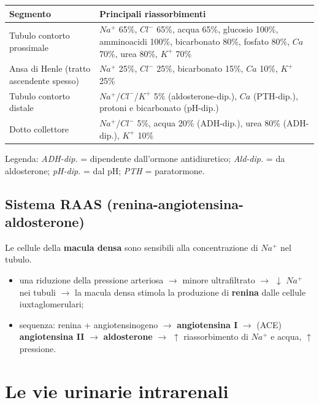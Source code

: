 \begin{table}[htbp]
  \centering \small \renewcommand{\arraystretch}{1.3}
  \begin{tabularx}{\textwidth}{|l|X|}
    \hline
    \textbf{Segmento} & \textbf{Principali riassorbimenti} \\
    \hline
    Tubulo contorto prossimale
      & $Na^+$ 65\%, $Cl^-$ 65\%, acqua 65\%, glucosio 100\%, amminoacidi 100\%, bicarbonato 80\%,
        fosfato 80\%, $Ca$ 70\%, urea 80\%, $K^+$ 70\% \\
    \hline
    Ansa di Henle (tratto ascendente spesso)
      & $Na^+$ 25\%, $Cl^-$ 25\%, bicarbonato 15\%, $Ca$ 10\%, $K^+$ 25\% \\
    \hline
    Tubulo contorto distale
      & $Na^+$/$Cl^-$/$K^+$ 5\% (aldosterone-dip.), $Ca$ (PTH-dip.), protoni e bicarbonato (pH-dip.) \\
    \hline
    Dotto collettore
      & $Na^+$/$Cl^-$ 5\%, acqua 20\% (ADH-dip.), urea 80\% (ADH-dip.), $K^+$ 10\% \\
    \hline
  \end{tabularx}
\end{table}
Legenda: \textit{ADH-dip.} = dipendente dall'ormone antidiuretico; \textit{Ald-dip.} = da
aldosterone; \textit{pH-dip.} = dal pH; \textit{PTH} = paratormone.

\subsection{Sistema RAAS (renina-angiotensina-aldosterone)}
Le cellule della \textbf{macula densa} sono sensibili alla concentrazione di $Na^+$ nel tubulo.
\begin{itemize}
  \item una riduzione della pressione arteriosa $\rightarrow$ minore ultrafiltrato $\rightarrow$
    $\downarrow$ $Na^+$ nei tubuli $\rightarrow$ la macula densa stimola la produzione di
    \textbf{renina} dalle cellule iuxtaglomerulari;
  \item sequenza: renina + angiotensinogeno $\rightarrow$ \textbf{angiotensina I} $\rightarrow$
    (ACE) \textbf{angiotensina II} $\rightarrow$ \textbf{aldosterone} $\rightarrow$ $\uparrow$
    riassorbimento di $Na^+$ e acqua, $\uparrow$ pressione.
\end{itemize}

\section{Le vie urinarie intrarenali}


